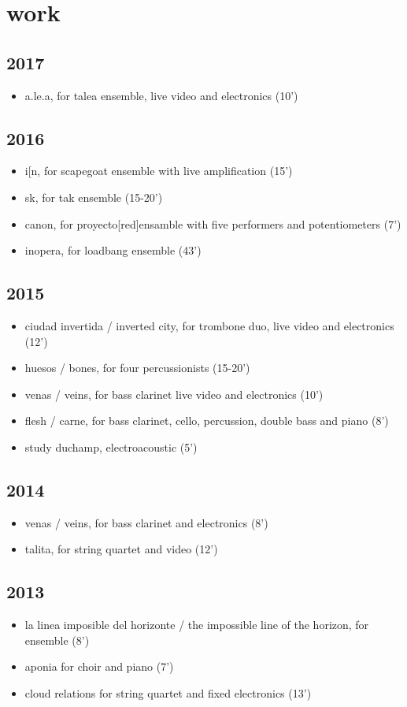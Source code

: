 \documentclass{book}
\begin{document}
\section{work}
\subsection{2017}
\begin{itemize}
\item a.le.a, for talea ensemble, live video and electronics (10’)
\end{itemize}
\subsection{2016}
\begin{itemize}
\item i[n, for scapegoat ensemble with live amplification (15’)
\item sk, for tak ensemble (15-20’)
\item canon, for proyecto[red]ensamble with five performers and potentiometers (7’)
\item inopera, for loadbang ensemble (43’)
\end{itemize}
\subsection{2015}
\begin{itemize}
\item ciudad invertida / inverted city, for trombone duo, live video and electronics (12’)
\item huesos / bones, for four percussionists (15-20’)
\item venas / veins, for bass clarinet live video and electronics (10’)
\item flesh / carne, for bass clarinet, cello, percussion, double bass and piano (8’)
\item study duchamp, electroacoustic (5’)
\end{itemize}
\subsection{2014}
\begin{itemize}
\item venas / veins, for bass clarinet and electronics (8’)
\item talita, for string quartet and video (12’)
\end{itemize}
\subsection{2013}
\begin{itemize}
\item la linea imposible del horizonte / the impossible line of the horizon, for ensemble (8’)
\item aponia for choir and piano (7’)
\item cloud relations for string quartet and fixed electronics (13’)
\end{itemize}
\end{document}
